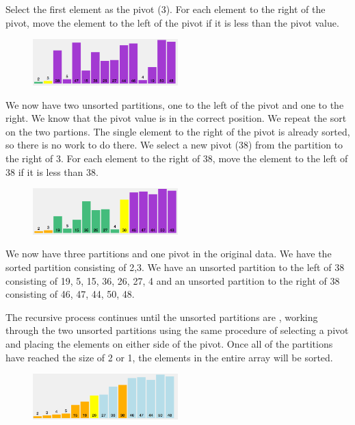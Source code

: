 Select the first element as the pivot (3).  For each element  to the right of the pivot, move the element to the left of the pivot if it is less than the pivot value.
 

\begin{figure}[H]
\centering
\includegraphics[width=0.5\textwidth]{pictures/quick3.png}
\label{fig:quick3}
\end{figure}

We now have two unsorted partitions, one to the left of the pivot and one to the right.  We know that the pivot value is in the correct position.  
We repeat the sort on the two partions.   The single element to the right of the pivot is already sorted, so there is no work to do there.
We select a new pivot (38) from the partition to the right of 3.
For each element to the right of 38, move the element to the left of 38 if it is less than 38.


\begin{figure}[H]
\centering
\includegraphics[width=0.5\textwidth]{pictures/quick4.png}
\label{fig:quick4}
\end{figure}

We now have three partitions  and one pivot in the original data.  We have the sorted partition consisting of 2,3.   We have an unsorted partition to the left of 38 consisting of 19, 5, 15, 36, 26, 27, 4 and an unsorted partition to the right of 38 consisting of 46, 47, 44, 50, 48.   

The recursive process continues until the unsorted partitions are ,  working through the two unsorted partitions using the same  procedure of selecting a pivot and placing the elements on either side of the pivot.    Once all of the partitions have reached the size of 2 or 1, the elements in the entire array will be sorted.



\begin{figure}[H]
\centering
\includegraphics[width=0.5\textwidth]{pictures/quick5.png}
\label{fig:quick5}
\end{figure}

